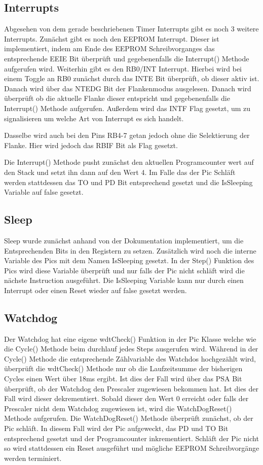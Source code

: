 \subsection{Interrupts}
Abgesehen von dem gerade beschriebenen Timer Interrupts gibt es noch 3 weitere Interrupts. 
Zunächst gibt es noch den EEPROM Interrupt. Dieser ist implementiert, indem am Ende des EEPROM Schreibvorganges das entsprechende EEIE Bit überprüft und gegebenenfalls die Interrupt() Methode aufgerufen wird. 
Weiterhin gibt es den RB0/INT Interrupt. Hierbei wird bei einem Toggle an RB0 zunächst durch das INTE Bit überprüft, ob dieser aktiv ist. Danach wird über das NTEDG Bit der Flankenmodus ausgelesen. Danach wird überprüft ob die aktuelle Flanke dieser entspricht und gegebenenfalls die Interrupt() Methode aufgerufen. Außerdem wird das INTF Flag gesetzt, um zu signalisieren um welche Art von Interrupt es sich handelt.

Dasselbe wird auch bei den Pins RB4-7 getan jedoch ohne die Selektierung der Flanke. Hier wird jedoch das RBIF Bit als Flag gesetzt.

Die Interrupt() Methode pusht zunächst den aktuellen Programcounter wert auf den Stack und setzt ihn dann auf den Wert 4. Im Falle das der Pic Schläft werden stattdessen das TO und PD Bit entsprechend gesetzt und die IsSleeping Variable auf false gesetzt.

\subsection{Sleep}
Sleep wurde zunächst anhand von der Dokumentation implementiert, um die Entsprechenden Bits in den Registern zu setzen. Zusätzlich wird noch die interne Variable des Pics mit dem Namen IsSleeping gesetzt. In der Step() Funktion des Pics wird diese Variable überprüft und nur falls der Pic nicht schläft wird die nächste Instruction ausgeführt. Die IsSleeping Variable kann nur durch einen Interrupt oder einen Reset wieder auf false gesetzt werden.


\subsection{Watchdog}
Der Watchdog hat eine eigene wdtCheck() Funktion in der Pic Klasse welche wie die Cycle() Methode beim durchlauf jedes Steps ausgerufen wird. Während in der Cycle() Methode die entsprechende Zählvariable des Watchdos hochgezählt wird, überprüft die wdtCheck() Methode nur ob die Laufzeitsumme der bisherigen Cycles einen Wert über 18ms ergibt. Ist dies der Fall wird über das PSA Bit überprüft, ob der Watchdog den Prescaler zugewiesen bekommen hat. Ist dies der Fall wird dieser dekrementiert. Sobald dieser den Wert 0 erreicht oder falls der Prescaler nicht dem Watchdog zugewiesen ist, wird die WatchDogReset() Methode aufgerufen.
Die WatchDogReset() Methode überprüft zunächst, ob der Pic schläft. In diesem Fall wird der Pic aufgeweckt, das PD und TO Bit entsprechend gesetzt und der Programcounter inkrementiert. Schläft der Pic nicht so wird stattdessen ein Reset ausgeführt und mögliche EEPROM Schreibvorgänge werden terminiert.


